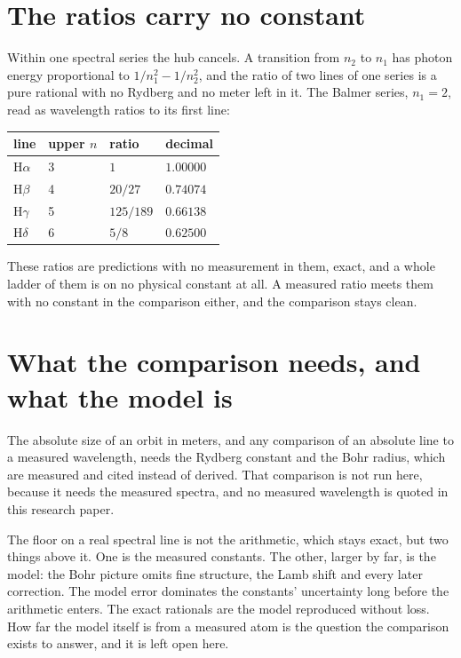 \section{The ratios carry no constant}

Within one spectral series the hub cancels. A transition from $n_2$ to $n_1$ has photon energy
proportional to $1/n_1^2 - 1/n_2^2$, and the ratio of two lines of one series is a pure rational with
no Rydberg and no meter left in it. The Balmer series, $n_1 = 2$, read as wavelength ratios to its
first line:

\begin{center}
\begin{tabular}{@{}llll@{}}
\toprule
line & upper $n$ & ratio & decimal \\
\midrule
H$\alpha$ & 3 & $1$      & $1.00000$ \\
H$\beta$  & 4 & $20/27$  & $0.74074$ \\
H$\gamma$ & 5 & $125/189$& $0.66138$ \\
H$\delta$ & 6 & $5/8$    & $0.62500$ \\
\bottomrule
\end{tabular}
\end{center}

\noindent These ratios are predictions with no measurement in them, exact, and a whole ladder of them
is on no physical constant at all. A measured ratio meets them with no constant in the comparison
either, and the comparison stays clean.

\section{What the comparison needs, and what the model is}

The absolute size of an orbit in meters, and any comparison of an absolute line to a measured
wavelength, needs the Rydberg constant and the Bohr radius, which are measured and cited instead of derived.
That comparison is not run here, because it needs the measured spectra, and no measured wavelength is
quoted in this research paper.

The floor on a real spectral line is not the arithmetic, which stays exact, but two things above it.
One is the measured constants. The other, larger by far, is the model: the Bohr picture omits fine
structure, the Lamb shift and every later correction. The model error dominates the constants'
uncertainty long before the arithmetic enters. The exact rationals are the model reproduced without
loss. How far the model itself is from a measured atom is the question the comparison exists to
answer, and it is left open here.
